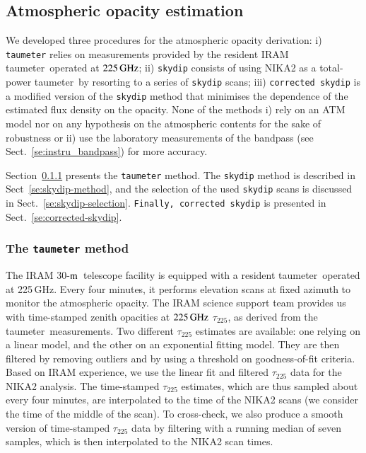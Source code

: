 \documentclass[traditionalabstract]{aa}
\newcommand{\trentemetre}{30-$\rm{m}$}
\newcommand{\taumeter}{taumeter}
\begin{document}
{\subsection{Atmospheric opacity estimation}
\label{se:opacity_methods}

We developed three procedures for the atmospheric opacity
derivation: i) {\tt taumeter} relies on measurements
provided by the resident IRAM \taumeter\ operated at $225\,\rm{GHz}$;
ii) {\tt skydip} consists of using NIKA2 as a total-power \taumeter\ 
by resorting to a series of {\tt skydip} scans;
iii) {\tt corrected skydip} is a modified
version of the {\tt skydip} method that minimises the dependence of the
estimated flux density on the opacity. None of the methods i) rely on an ATM model nor on any
hypothesis on the atmospheric contents for the sake of robustness or
ii) use the laboratory measurements of the bandpass (see Sect.~\ref{se:instru_bandpass}) for more accuracy.  

Section~\ref{se:taumeter-method} presents the {\tt taumeter} method. The 
{\tt skydip} method is described in Sect~\ref{se:skydip-method}, and
the selection of the used {\tt skydip} scans is discussed in
Sect.~\ref{se:skydip-selection}.
{\tt Finally, corrected skydip} is presented in Sect.~\ref{se:corrected-skydip}.

\subsubsection{The {\tt taumeter} method}
\label{se:taumeter-method}

The IRAM \trentemetre\ telescope facility is equipped with a
resident \taumeter\ operated at 225\,GHz. Every four
minutes, it performs elevation scans at fixed azimuth
to monitor the atmospheric opacity.
The IRAM science support
team provides us with time-stamped zenith opacities at $225\,\rm{GHz}$
$\tau_{225}$, as derived from the \taumeter\ measurements. Two different
$\tau_{225}$ estimates are available: one relying
on a linear model, and the other on an exponential fitting model. They
are then filtered by removing outliers and by using a threshold on
goodness-of-fit criteria.
Based on IRAM experience, we use the linear fit and filtered $\tau_{225}$
data for the NIKA2 analysis. The time-stamped $\tau_{225}$ estimates,
which are thus sampled about every four minutes, are interpolated to the time
of the NIKA2 scans (we consider the time of the middle of the
scan). To cross-check, we also produce a smooth version of time-stamped
$\tau_{225}$ data by
filtering with a running median of seven samples, which is then
interpolated to the NIKA2 scan times.

}
\end{document}
